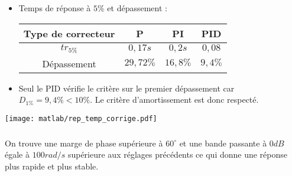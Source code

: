 \begin{multicols}{2}
\begin{itemize}
\item Temps de réponse à $5\%$ et dépassement : 

\begin{tabular}{|c|c|c|c|}
\hline 
Type de correcteur & \textbf{P} & \textbf{PI} & \textbf{PID} \\ 
\hline 
$tr_{5\%}$ & $0,17s$ & $0,2s$ & $0,08$ \\ 
\hline 
Dépassement & $29,72\%$ & $16,8\%$ & $9,4\%$ \\ 
\hline 
\end{tabular} 

\item Seul le PID vérifie le critère sur le premier dépassement car $D_{1\%}=9,4\%<10\%$. Le critère d'amortissement est
donc respecté.
\end{itemize}

\begin{center}
\texttt{[image: matlab/rep\_temp\_corrige.pdf]}
\end{center}

\subparagraph{}\textit{}%

On trouve une marge de phase supérieure à $60^{\circ}$ et une bande passante à $0dB$ égale à $100rad/s$ supérieure aux réglages précédents ce qui donne une réponse plus rapide et plus stable.

\end{multicols}

%
%
%
%
%
%
%
%
%
%
%
%
